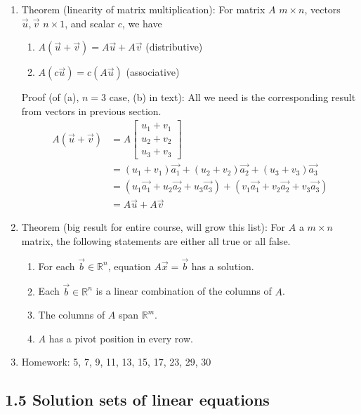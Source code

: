 \documentclass{article}
\begin{document}
\begin{enumerate}
\item Theorem (linearity of matrix multiplication): For matrix $A$ $m \times n$, vectors $\vec{u}, \vec{v}$ $n \times 1$, and scalar $c$, we have
\begin{enumerate}
\item $A(\vec{u} + \vec{v}) = A\vec{u} + A\vec{v}$ (distributive)
\item $A(c\vec{u}) = c(A\vec{u})$ (associative)
\end{enumerate}
Proof (of (a), $n=3$ case, (b) in text): All we need is the corresponding result from vectors in previous section.
\begin{align*}
A(\vec{u} + \vec{v})
&= A \left[
\begin{array}{c}
u_1+v_1 \\
u_2+v_2 \\
u_3+v_3
\end{array} \right]\\
&= (u_1+v_1) \vec{a_1} + (u_2+v_2) \vec{a_2} + (u_3+v_3) \vec{a_3} \\
&= (u_1 \vec{a_1} + u_2 \vec{a_2} + u_3 \vec{a_3})
+ (v_1 \vec{a_1} + v_2 \vec{a_2} + v_3 \vec{a_3})\\
&= A\vec{u} + A\vec{v}
\end{align*}

\item Theorem (big result for entire course, will grow this list): For $A$ a $m\times n$ matrix, the following statements are either all true or all false.
\begin{enumerate}
\item For each $\vec{b} \in \mathbb{R}^n$, equation $A\vec{x}=\vec{b}$ has a solution.
\item Each $\vec{b} \in \mathbb{R}^n$ is a linear combination of the columns of $A$.
\item The columns of $A$ span $\mathbb{R}^m$.
\item $A$ has a pivot position in every row.
\end{enumerate} 

\item Homework: 5, 7, 9, 11, 13, 15, 17, 23, 29, 30

\end{enumerate}

\subsection{1.5 Solution sets of linear equations}
\end{document}
